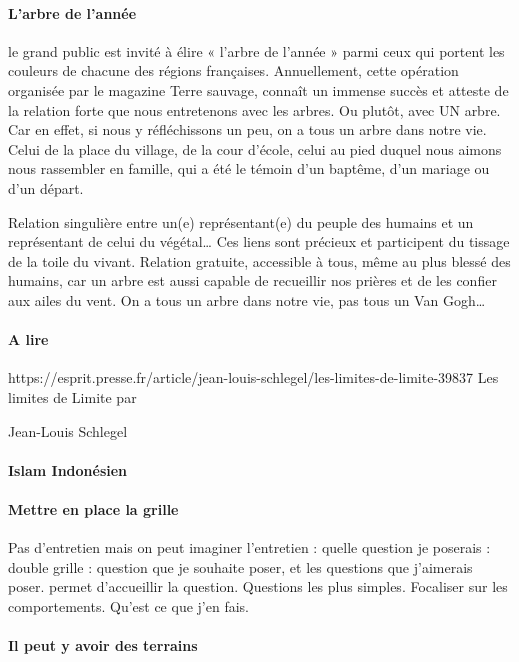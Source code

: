 \paragraph{L’arbre de l’année}
le grand public est invité à élire « l’arbre de l’année » parmi ceux qui portent les couleurs de chacune des régions françaises. Annuellement, cette opération organisée par le magazine Terre sauvage, connaît un immense succès et atteste de la relation forte que nous entretenons avec les arbres. Ou plutôt, avec UN arbre. Car en effet, si nous y réfléchissons un peu, on a tous un arbre dans notre vie. Celui de la place du village, de la cour d’école, celui au pied duquel nous aimons nous rassembler en famille, qui a été le témoin d’un baptême, d’un mariage ou d’un départ.
 
Relation singulière entre un(e) représentant(e) du peuple des humains et un représentant de celui du végétal… Ces liens sont précieux et participent du tissage de la toile du vivant. Relation gratuite, accessible à tous, même au plus blessé des humains, car un arbre est aussi capable de recueillir nos prières et de les confier aux ailes du vent. On a tous un arbre dans notre vie, pas tous un Van Gogh…

\paragraph{A lire}
\cite{revol_reception_2017}

\cite{lang_generations_2020}

\cite{brugidou_reception_2020}

\cite{flipo_limite_2019}
https://esprit.presse.fr/article/jean-louis-schlegel/les-limites-de-limite-39837 Les limites de Limite
par

Jean-Louis Schlegel
\paragraph{Islam Indonésien}


\paragraph{Mettre en place la grille}
Pas d'entretien mais on peut imaginer l'entretien : quelle question je poserais : double grille : question que je souhaite poser, et les questions que j'aimerais poser.
permet d'accueillir la question. 
Questions les plus simples. Focaliser sur les comportements.  Qu'est ce que j'en fais. 



\paragraph{Il peut y avoir des terrains }
